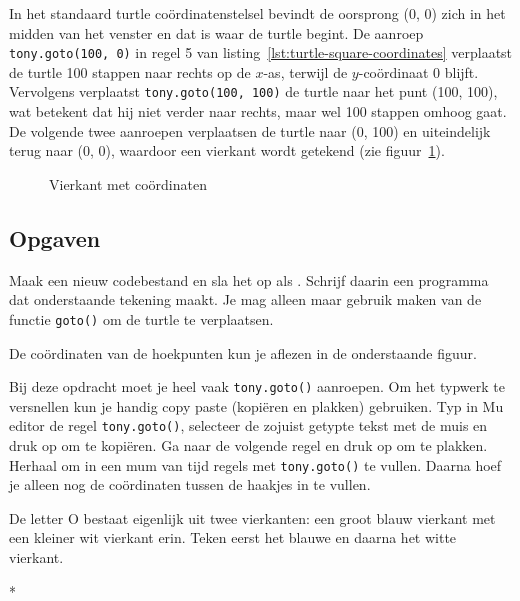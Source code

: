 \documentclass[../main]{subfiles}
\begin{document}
In het standaard turtle coördinatenstelsel bevindt de oorsprong (0, 0) zich in het midden van het venster en dat is waar de turtle begint. De aanroep \texttt{tony.goto(100, 0)} in regel 5 van listing~\ref{lst:turtle-square-coordinates} verplaatst de turtle 100 stappen naar rechts op de \(x\)-as, terwijl de \(y\)-coördinaat 0 blijft. Vervolgens verplaatst \texttt{tony.goto(100, 100)} de turtle naar het punt (100, 100), wat betekent dat hij niet verder naar rechts, maar wel 100 stappen omhoog gaat. De volgende twee aanroepen verplaatsen de turtle naar (0, 100) en uiteindelijk terug naar (0, 0), waardoor een vierkant wordt getekend (zie figuur~\ref{fig:turtle-square-coordinates}).

\begin{figure}[h]
    \centering
    \caption{Vierkant met coördinaten}%
    \label{fig:turtle-square-coordinates}
\end{figure}

\subsection*{Opgaven}

\begin{opgave}[icons={laptop}]
Maak een nieuw codebestand en sla het op als . Schrijf daarin een programma dat onderstaande tekening maakt. Je mag alleen maar gebruik maken van de functie \texttt{goto()} om de turtle te verplaatsen. 

\begin{center}
\end{center}

De coördinaten van de hoekpunten kun je aflezen in de onderstaande figuur.

\begin{center}
\end{center}

\begin{hints}
\item Bij deze opdracht moet je heel vaak \texttt{tony.goto()} aanroepen. Om het typwerk te versnellen kun je handig copy paste (kopiëren en plakken) gebruiken. Typ in Mu editor de regel \texttt{tony.goto()}, selecteer de zojuist getypte tekst met de muis en druk op  om te kopiëren. Ga naar de volgende regel en druk op  om te plakken. Herhaal  om in een mum van tijd regels met \texttt{tony.goto()} te vullen. Daarna hoef je alleen nog de coördinaten tussen de haakjes in te vullen.
\item De letter O bestaat eigenlijk uit twee vierkanten: een groot blauw vierkant met een kleiner wit vierkant erin. Teken eerst het blauwe en daarna het witte vierkant.
\end{hints}
\end{opgave}
\begin{antwoord}
*
\end{antwoord}
\end{document}

